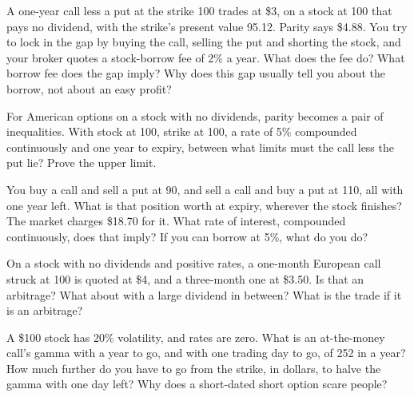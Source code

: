 \begin{question}\label{iq:iv2:options-parity-and-greeks:16}
A one-year call less a put at the strike 100 trades at \$3, on a stock at 100 that pays no dividend, with the strike's present value 95.12. Parity says \$4.88. You try to lock in the gap by buying the call, selling the put and shorting the stock, and your broker quotes a stock-borrow fee of 2\% a year. What does the fee do? What borrow fee does the gap imply? Why does this gap usually tell you about the borrow, not about an easy profit?
\end{question}

\begin{question}\label{iq:iv2:options-parity-and-greeks:17}
For American options on a stock with no dividends, parity becomes a pair of inequalities. With stock at 100, strike at 100, a rate of 5\% compounded continuously and one year to expiry, between what limits must the call less the put lie? Prove the upper limit.
\end{question}

\begin{question}\label{iq:iv2:options-parity-and-greeks:18}
You buy a call and sell a put at 90, and sell a call and buy a put at 110, all with one year left. What is that position worth at expiry, wherever the stock finishes? The market charges \$18.70 for it. What rate of interest, compounded continuously, does that imply? If you can borrow at 5\%, what do you do?
\end{question}

\begin{question}\label{iq:iv2:options-parity-and-greeks:19}
On a stock with no dividends and positive rates, a one-month European call struck at 100 is quoted at \$4, and a three-month one at \$3.50. Is that an arbitrage? What about with a large dividend in between? What is the trade if it is an arbitrage?
\end{question}

\begin{question}\label{iq:iv2:options-parity-and-greeks:20}
A \$100 stock has 20\% volatility, and rates are zero. What is an at-the-money call's gamma with a year to go, and with one trading day to go, of 252 in a year? How much further do you have to go from the strike, in dollars, to halve the gamma with one day left? Why does a short-dated short option scare people?
\end{question}

